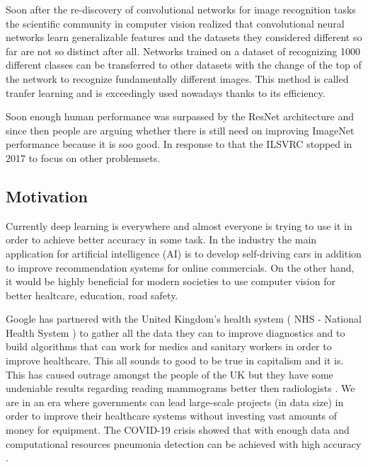 \documentclass[a4paper,12pt]{article}
\begin{document}
\vspace{4mm}

\par Soon after the re-discovery of convolutional networks for image recognition tasks the scientific community in computer vision realized that convolutional neural networks learn generalizable features and the datasets they considered different so far are not so distinct after all. Networks trained on a dataset of recognizing 1000 different classes can be transferred to other datasets with the change of the top of the network to recognize fundamentally different images. This method is called tranfer learning and is exceedingly used nowadays thanks to its efficiency.

\vspace{4mm}

\par Soon enough human performance was surpassed \cite{he2016deep} by the ResNet architecture and since then people are arguing whether there is still need on improving ImageNet performance because it is soo good. In response to that the ILSVRC stopped in 2017 to focus on other problemsets. 

\vspace{7mm}

\subsection{Motivation}

\vspace{7mm}

Currently deep learning is everywhere and almost everyone is trying to use it in order to achieve better accuracy in some task. In the industry the main application for artificial intelligence (AI) is to develop self-driving cars in addition to improve recommendation systems for online commercials. On the other hand, it would be highly beneficial for modern societies to use computer vision for better healtcare, education, road safety.

\vspace{4mm}

\par Google has partnered with the United Kingdom's health system ( NHS - National Health System ) to gather all the data they can to improve diagnostics and to build algorithms that can work for medics and sanitary workers in order to improve healthcare. This all sounds to good to be true in capitalism and it is. This has caused outrage amongst the people of the UK \cite{kollewe_2019} but they have some undeniable results regarding reading mammograms better then radiologists \cite{mckinney2020international}. We are in an era where governments can lead large-scale projects (in data size) in order to improve their healthcare systems without investing vast amounts of money for equipment. The COVID-19 crisis showed that with enough data and computational resources pneumonia detection can be achieved with high accuracy \cite{nvidia}.
\end{document}
